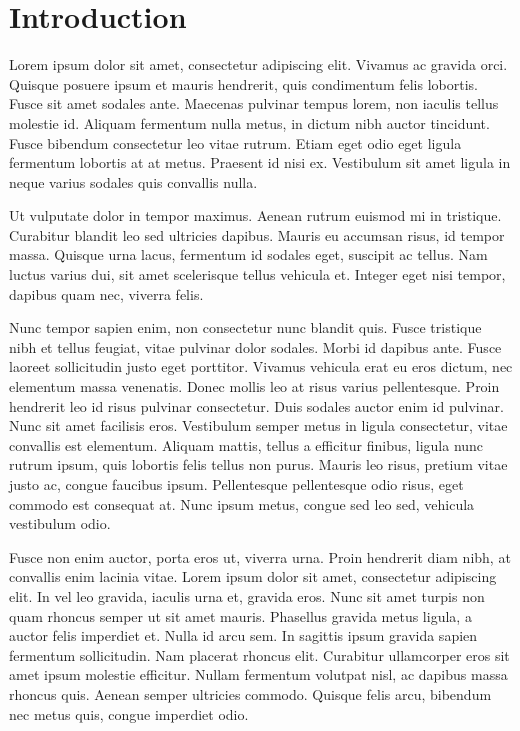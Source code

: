 \chapter*{Introduction}

Lorem ipsum dolor sit amet, consectetur adipiscing elit. Vivamus ac gravida orci. Quisque posuere ipsum et mauris hendrerit, quis condimentum felis lobortis. Fusce sit amet sodales ante. Maecenas pulvinar tempus lorem, non iaculis tellus molestie id. Aliquam fermentum nulla metus, in dictum nibh auctor tincidunt. Fusce bibendum consectetur leo vitae rutrum. Etiam eget odio eget ligula fermentum lobortis at at metus. Praesent id nisi ex. Vestibulum sit amet ligula in neque varius sodales quis convallis nulla.

Ut vulputate dolor in tempor maximus. Aenean rutrum euismod mi in tristique. Curabitur blandit leo sed ultricies dapibus. Mauris eu accumsan risus, id tempor massa. Quisque urna lacus, fermentum id sodales eget, suscipit ac tellus. Nam luctus varius dui, sit amet scelerisque tellus vehicula et. Integer eget nisi tempor, dapibus quam nec, viverra felis.

Nunc tempor sapien enim, non consectetur nunc blandit quis. Fusce tristique nibh et tellus feugiat, vitae pulvinar dolor sodales. Morbi id dapibus ante. Fusce laoreet sollicitudin justo eget porttitor. Vivamus vehicula erat eu eros dictum, nec elementum massa venenatis. Donec mollis leo at risus varius pellentesque. Proin hendrerit leo id risus pulvinar consectetur. Duis sodales auctor enim id pulvinar. Nunc sit amet facilisis eros. Vestibulum semper metus in ligula consectetur, vitae convallis est elementum. Aliquam mattis, tellus a efficitur finibus, ligula nunc rutrum ipsum, quis lobortis felis tellus non purus. Mauris leo risus, pretium vitae justo ac, congue faucibus ipsum. Pellentesque pellentesque odio risus, eget commodo est consequat at. Nunc ipsum metus, congue sed leo sed, vehicula vestibulum odio.

Fusce non enim auctor, porta eros ut, viverra urna. Proin hendrerit diam nibh, at convallis enim lacinia vitae. Lorem ipsum dolor sit amet, consectetur adipiscing elit. In vel leo gravida, iaculis urna et, gravida eros. Nunc sit amet turpis non quam rhoncus semper ut sit amet mauris. Phasellus gravida metus ligula, a auctor felis imperdiet et. Nulla id arcu sem. In sagittis ipsum gravida sapien fermentum sollicitudin. Nam placerat rhoncus elit. Curabitur ullamcorper eros sit amet ipsum molestie efficitur. Nullam fermentum volutpat nisl, ac dapibus massa rhoncus quis. Aenean semper ultricies commodo. Quisque felis arcu, bibendum nec metus quis, congue imperdiet odio.

